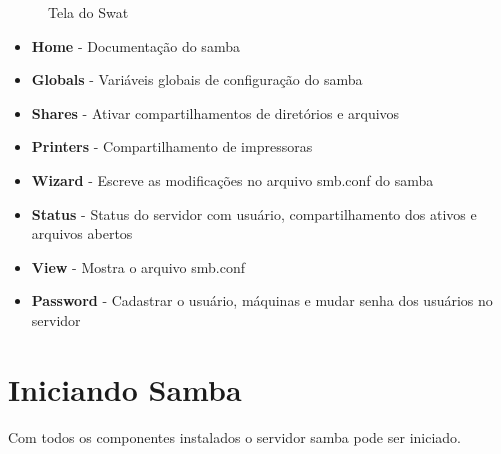 \begin{figure}[ht]
   	\centering
   	\caption{Tela do Swat}
    \label{swat}
\end{figure}

\begin{itemize}
    \item \textbf{Home} - Documentação do samba
    \item \textbf{Globals} - Variáveis globais de configuração do samba
    \item \textbf{Shares} - Ativar compartilhamentos de diretórios e arquivos
    \item \textbf{Printers} - Compartilhamento de impressoras
    \item \textbf{Wizard} - Escreve as modificações no arquivo smb.conf do samba
    \item \textbf{Status} - Status do servidor com usuário, compartilhamento dos ativos e arquivos abertos
    \item \textbf{View} - Mostra o arquivo smb.conf
    \item \textbf{Password} - Cadastrar o usuário, máquinas e mudar senha dos usuários no servidor
\end{itemize}

\section{Iniciando Samba}

Com todos os componentes instalados o servidor samba pode ser iniciado.

